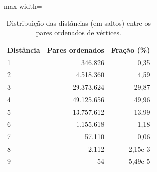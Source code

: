 \begin{table}[!htb]
\centering
\caption{Distribuição das distâncias (em saltos) entre os pares ordenados de vértices.}
\label{tab:distancias}
\begin{adjustbox}{max width=\linewidth}
\begin{tabular}{lrr}
\toprule
Distância & Pares ordenados & Fração (\%) \\
\midrule
1 & 346.826 & 0,35 \\
2 & 4.518.360 & 4,59 \\
3 & 29.373.624 & 29,87 \\
4 & 49.125.656 & 49,96 \\
5 & 13.757.612 & 13,99 \\
6 & 1.155.618 & 1,18 \\
7 & 57.110 & 0,06 \\
8 & 2.112 & 2,15e-3 \\
9 & 54 & 5,49e-5 \\
\bottomrule
\end{tabular}
\end{adjustbox}
\end{table}
